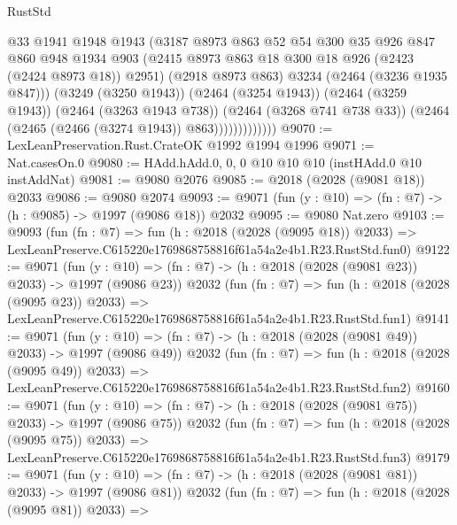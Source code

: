 \begin{lexlean}{RustStd}
\begin{coremodule}
                          @33
                          @1941
                          @1948
                          @1943
                          (@3187
                            @8973
                            @863
                            @52
                            @54
                            @300
                            @35
                            @926
                            @847
                            @860
                            @948
                            @1934
                            @903
                            (@2415 @8973 @863 @18 @300 @18 @926 (@2423 (@2424 @8973 @18)) @2951)
                            (@2918 @8973 @863)
                            @3234
                            (@2464 (@3236 @1935 @847)))
                          (@3249 (@3250 @1943))
                          (@2464 (@3254 @1943))
                          (@2464 (@3259 @1943))
                          (@2464 (@3263 @1943 @738))
                          (@2464 (@3268 @741 @738 @33))
                          (@2464 (@2465 (@2466 (@3274 @1943)) @863)))))))))))))
@9070 := LexLeanPreservation.Rust.CrateOK @1992 @1994 @1996
@9071 := Nat.casesOn.{0}
@9080 := HAdd.hAdd.{0, 0, 0} @10 @10 @10 (instHAdd.{0} @10 instAddNat)
@9081 := @9080 @2076
@9085 := @2018 (@2028 (@9081 @18)) @2033
@9086 := @9080 @2074
@9093 := @9071 (fun (y : @10) => (fn : @7) -> (h : @9085) -> @1997 (@9086 @18)) @2032
@9095 := @9080 Nat.zero
@9103 := @9093
    (fun (fn : @7) =>
    fun (h : @2018 (@2028 (@9095 @18)) @2033) =>
    LexLeanPreserve.C615220e1769868758816f61a54a2e4b1.R23.RustStd.fun0)
@9122 := @9071
    (fun (y : @10) => (fn : @7) -> (h : @2018 (@2028 (@9081 @23)) @2033) -> @1997 (@9086 @23))
    @2032
    (fun (fn : @7) =>
    fun (h : @2018 (@2028 (@9095 @23)) @2033) =>
    LexLeanPreserve.C615220e1769868758816f61a54a2e4b1.R23.RustStd.fun1)
@9141 := @9071
    (fun (y : @10) => (fn : @7) -> (h : @2018 (@2028 (@9081 @49)) @2033) -> @1997 (@9086 @49))
    @2032
    (fun (fn : @7) =>
    fun (h : @2018 (@2028 (@9095 @49)) @2033) =>
    LexLeanPreserve.C615220e1769868758816f61a54a2e4b1.R23.RustStd.fun2)
@9160 := @9071
    (fun (y : @10) => (fn : @7) -> (h : @2018 (@2028 (@9081 @75)) @2033) -> @1997 (@9086 @75))
    @2032
    (fun (fn : @7) =>
    fun (h : @2018 (@2028 (@9095 @75)) @2033) =>
    LexLeanPreserve.C615220e1769868758816f61a54a2e4b1.R23.RustStd.fun3)
@9179 := @9071
    (fun (y : @10) => (fn : @7) -> (h : @2018 (@2028 (@9081 @81)) @2033) -> @1997 (@9086 @81))
    @2032
    (fun (fn : @7) =>
    fun (h : @2018 (@2028 (@9095 @81)) @2033) =>

\end{coremodule}
\end{lexlean}
